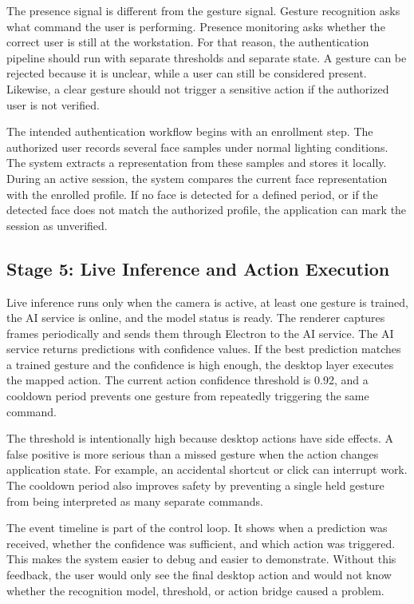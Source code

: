 \documentclass[10pt,twocolumn]{article}
\begin{document}
The presence signal is different from the gesture signal.
Gesture recognition asks what command the user is performing.
Presence monitoring asks whether the correct user is still at the workstation.
For that reason, the authentication pipeline should run with separate thresholds and separate state.
A gesture can be rejected because it is unclear, while a user can still be considered present.
Likewise, a clear gesture should not trigger a sensitive action if the authorized user is not verified.

The intended authentication workflow begins with an enrollment step.
The authorized user records several face samples under normal lighting conditions.
The system extracts a representation from these samples and stores it locally.
During an active session, the system compares the current face representation with the enrolled profile.
If no face is detected for a defined period, or if the detected face does not match the authorized profile, the application can mark the session as unverified.

\subsection{Stage 5: Live Inference and Action Execution}
Live inference runs only when the camera is active, at least one gesture is trained, the AI service is online, and the model status is ready.
The renderer captures frames periodically and sends them through Electron to the AI service.
The AI service returns predictions with confidence values.
If the best prediction matches a trained gesture and the confidence is high enough, the desktop layer executes the mapped action.
The current action confidence threshold is 0.92, and a cooldown period prevents one gesture from repeatedly triggering the same command.

The threshold is intentionally high because desktop actions have side effects.
A false positive is more serious than a missed gesture when the action changes application state.
For example, an accidental shortcut or click can interrupt work.
The cooldown period also improves safety by preventing a single held gesture from being interpreted as many separate commands.

The event timeline is part of the control loop.
It shows when a prediction was received, whether the confidence was sufficient, and which action was triggered.
This makes the system easier to debug and easier to demonstrate.
Without this feedback, the user would only see the final desktop action and would not know whether the recognition model, threshold, or action bridge caused a problem.
\end{document}
